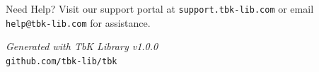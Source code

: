 \documentclass[11pt,a4paper]{article}
\begin{document}
\begin{tbkInfo}{Need Help?}
Visit our support portal at \texttt{support.tbk-lib.com} or email \texttt{help@tbk-lib.com} for assistance.
\end{tbkInfo}


\clearpage
{}

\begin{tbkSpecTable}
\end{tbkSpecTable}

\vfill
\begin{center}
\textit{Generated with TbK Library v1.0.0}\\
\texttt{github.com/tbk-lib/tbk}
\end{center}
\end{document}
